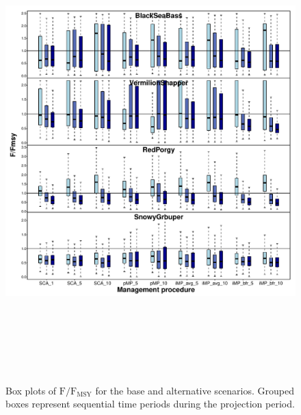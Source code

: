 \documentclass[12pt,english]{article}
\begin{document}
\begin{figure}[!ht]
\begin{center}
\includegraphics[width=6in,height=7in]{../Figs/boxplotFFMSY1.pdf}
\end{center}
\begin{flushleft}
\caption{Box plots of $\mathrm{F/F_{MSY}}$ for the base and alternative scenarios. Grouped boxes represent sequential time periods during the projection period.}
\label{fig:boxplotFFMSY1}
\end{flushleft}
\end{figure}
\end{document}
